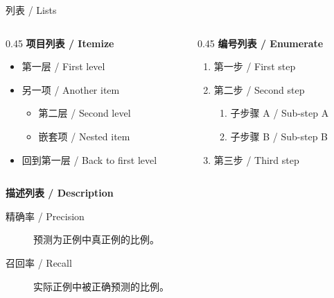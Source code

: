 \documentclass[aspectratio=169]{beamer}
\begin{document}

\begin{frame}{列表 / Lists}
    \begin{columns}[T]
        \begin{column}{0.45\textwidth}
            \textbf{项目列表 / Itemize}
            \begin{itemize}
                \item 第一层 / First level
                \item 另一项 / Another item
                    \begin{itemize}
                        \item 第二层 / Second level
                        \item 嵌套项 / Nested item
                    \end{itemize}
                \item 回到第一层 / Back to first level
            \end{itemize}
        \end{column}

        \begin{column}{0.45\textwidth}
            \textbf{编号列表 / Enumerate}
            \begin{enumerate}
                \item 第一步 / First step
                \item 第二步 / Second step
                    \begin{enumerate}
                        \item 子步骤 A / Sub-step A
                        \item 子步骤 B / Sub-step B
                    \end{enumerate}
                \item 第三步 / Third step
            \end{enumerate}
        \end{column}
    \end{columns}

    \vspace{0.4cm}
    \textbf{描述列表 / Description}
    \begin{description}
        \item[精确率 / Precision] 预测为正例中真正例的比例。
        \item[召回率 / Recall] 实际正例中被正确预测的比例。
    \end{description}
\end{frame}
\end{document}
